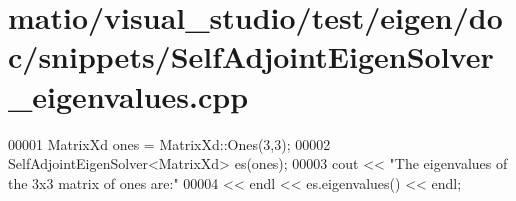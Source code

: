 \hypertarget{matio_2visual__studio_2test_2eigen_2doc_2snippets_2_self_adjoint_eigen_solver__eigenvalues_8cpp_source}{}\section{matio/visual\+\_\+studio/test/eigen/doc/snippets/\+Self\+Adjoint\+Eigen\+Solver\+\_\+eigenvalues.cpp}
\label{matio_2visual__studio_2test_2eigen_2doc_2snippets_2_self_adjoint_eigen_solver__eigenvalues_8cpp_source}

\begin{DoxyCode}
00001 MatrixXd ones = MatrixXd::Ones(3,3);
00002 SelfAdjointEigenSolver<MatrixXd> es(ones);
00003 cout << \textcolor{stringliteral}{"The eigenvalues of the 3x3 matrix of ones are:"} 
00004      << endl << es.eigenvalues() << endl;
\end{DoxyCode}
